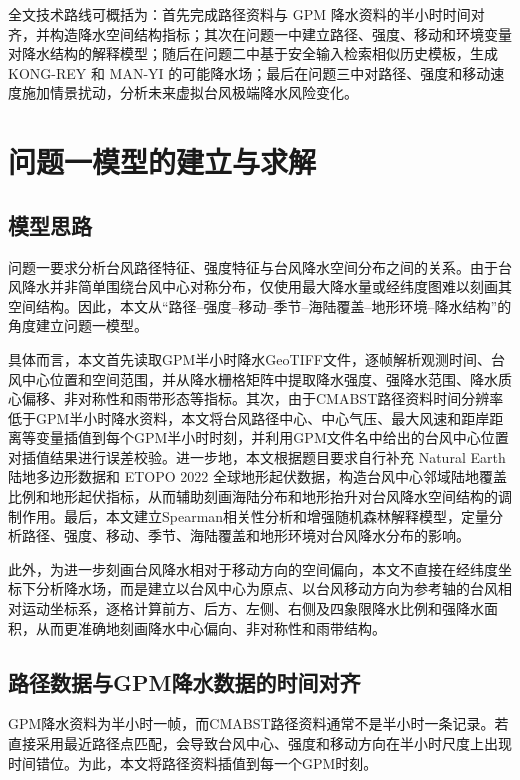 \documentclass[UTF8,a4paper,zihao=5,fontset=fandol]{ctexart}
\numberwithin{equation}{section}
\numberwithin{figure}{section}
\numberwithin{table}{section}
\begin{document}
全文技术路线可概括为：首先完成路径资料与 GPM 降水资料的半小时时间对齐，并构造降水空间结构指标；其次在问题一中建立路径、强度、移动和环境变量对降水结构的解释模型；随后在问题二中基于安全输入检索相似历史模板，生成 KONG-REY 和 MAN-YI 的可能降水场；最后在问题三中对路径、强度和移动速度施加情景扰动，分析未来虚拟台风极端降水风险变化。

\section{问题一模型的建立与求解}

\subsection{模型思路}

问题一要求分析台风路径特征、强度特征与台风降水空间分布之间的关系。由于台风降水并非简单围绕台风中心对称分布，仅使用最大降水量或经纬度图难以刻画其空间结构。因此，本文从“路径--强度--移动--季节--海陆覆盖--地形环境--降水结构”的角度建立问题一模型。

具体而言，本文首先读取GPM半小时降水GeoTIFF文件，逐帧解析观测时间、台风中心位置和空间范围，并从降水栅格矩阵中提取降水强度、强降水范围、降水质心偏移、非对称性和雨带形态等指标。其次，由于CMABST路径资料时间分辨率低于GPM半小时降水资料，本文将台风路径中心、中心气压、最大风速和距岸距离等变量插值到每个GPM半小时时刻，并利用GPM文件名中给出的台风中心位置对插值结果进行误差校验。进一步地，本文根据题目要求自行补充 Natural Earth 陆地多边形数据和 ETOPO 2022 全球地形起伏数据，构造台风中心邻域陆地覆盖比例和地形起伏指标，从而辅助刻画海陆分布和地形抬升对台风降水空间结构的调制作用。最后，本文建立Spearman相关性分析和增强随机森林解释模型，定量分析路径、强度、移动、季节、海陆覆盖和地形环境对台风降水分布的影响。

此外，为进一步刻画台风降水相对于移动方向的空间偏向，本文不直接在经纬度坐标下分析降水场，而是建立以台风中心为原点、以台风移动方向为参考轴的台风相对运动坐标系，逐格计算前方、后方、左侧、右侧及四象限降水比例和强降水面积，从而更准确地刻画降水中心偏向、非对称性和雨带结构。

\subsection{路径数据与GPM降水数据的时间对齐}

GPM降水资料为半小时一帧，而CMABST路径资料通常不是半小时一条记录。若直接采用最近路径点匹配，会导致台风中心、强度和移动方向在半小时尺度上出现时间错位。为此，本文将路径资料插值到每一个GPM时刻。
\end{document}
